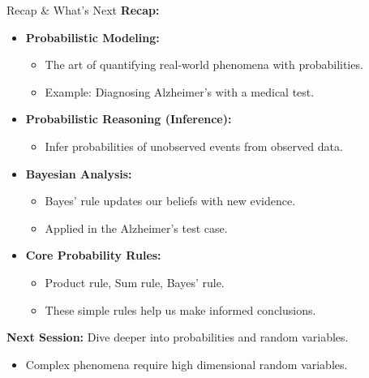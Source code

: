 \documentclass{beamer}
\begin{document}
\begin{frame}{Recap \& What's Next}
  \textbf{Recap:}
  \begin{itemize}
    \item \textbf{Probabilistic Modeling:}
    \begin{itemize}
      \item The art of quantifying real-world phenomena with probabilities.
      \item Example: Diagnosing Alzheimer’s with a medical test.
    \end{itemize}

    \item \textbf{Probabilistic Reasoning (Inference):}
    \begin{itemize}
    \item Infer probabilities of unobserved events from observed data.
    \end{itemize}

    \item \textbf{Bayesian Analysis:}
      \begin{itemize}
      \item Bayes' rule updates our beliefs with new evidence.
      \item Applied in the Alzheimer’s test case.
    \end{itemize}

    \item \textbf{Core Probability Rules:}
    \begin{itemize}
      \item Product rule, Sum rule, Bayes' rule.
      \item These simple rules help us make informed conclusions.
    \end{itemize}
  \end{itemize}

  \vspace{1em}

  \textbf{Next Session:} Dive deeper into probabilities and random variables.
  \begin{itemize}
  \item Complex phenomena require high dimensional random variables.
  \end{itemize}

\end{frame}
\end{document}
